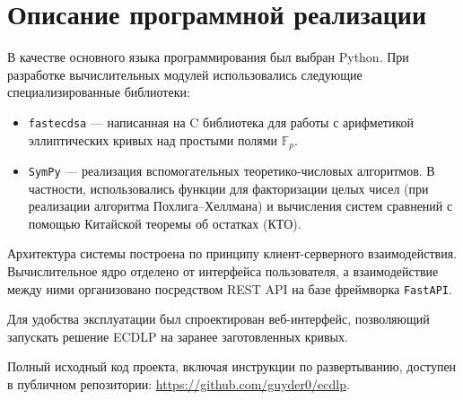 \section{Описание программной реализации}

В качестве основного языка программирования был выбран Python. При разработке вычислительных модулей использовались следующие специализированные библиотеки:
\begin{itemize}
    \item \texttt{fastecdsa} — написанная на C библиотека для работы с арифметикой эллиптических кривых над простыми полями $\mathbb{F}_p$.
    \item \texttt{SymPy} — реализация вспомогательных теоретико-числовых алгоритмов. В частности, использовались функции для факторизации целых чисел (при реализации алгоритма Похлига--Хеллмана) и вычисления систем сравнений с помощью Китайской теоремы об остатках (КТО).
\end{itemize}

Архитектура системы построена по принципу клиент-серверного взаимодействия. Вычислительное ядро отделено от интерфейса пользователя, а взаимодействие между ними организовано посредством REST API на базе фреймворка \texttt{FastAPI}.

Для удобства эксплуатации был спроектирован веб-интерфейс, позволяющий запускать решение ECDLP на заранее заготовленных кривых.

Полный исходный код проекта, включая инструкции по развертыванию, доступен в публичном репозитории: \url{https://github.com/guyder0/ecdlp}.